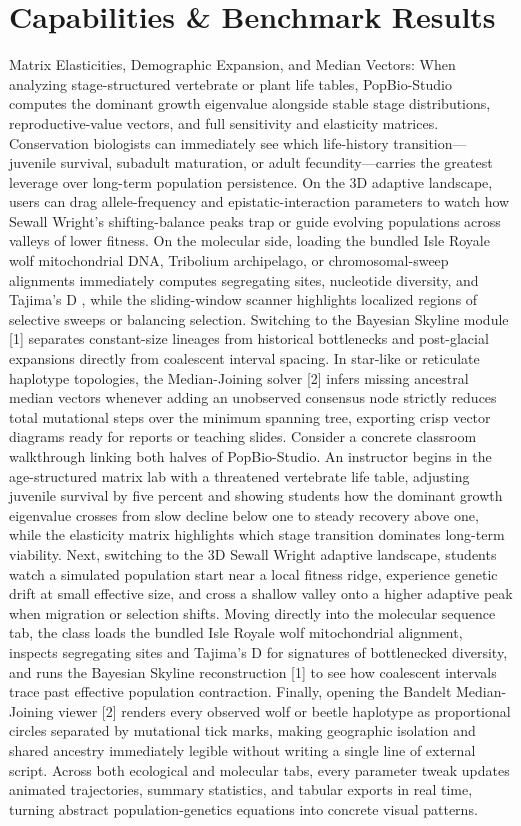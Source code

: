 \documentclass[10pt,letterpaper]{article}
\begin{document}
\section{Capabilities \& Benchmark Results}
Matrix Elasticities, Demographic Expansion, and Median Vectors: When analyzing stage-structured vertebrate or plant life tables, PopBio-Studio computes the dominant growth eigenvalue alongside stable stage distributions, reproductive-value vectors, and full sensitivity and elasticity matrices. Conservation biologists can immediately see which life-history transition---juvenile survival, subadult maturation, or adult fecundity---carries the greatest leverage over long-term population persistence. On the 3D adaptive landscape, users can drag allele-frequency and epistatic-interaction parameters to watch how Sewall Wright's shifting-balance peaks trap or guide evolving populations across valleys of lower fitness. On the molecular side, loading the bundled Isle Royale wolf mitochondrial DNA, Tribolium archipelago, or chromosomal-sweep alignments immediately computes segregating sites, nucleotide diversity, and Tajima's D , while the sliding-window scanner highlights localized regions of selective sweeps or balancing selection. Switching to the Bayesian Skyline module [1] separates constant-size lineages from historical bottlenecks and post-glacial expansions directly from coalescent interval spacing. In star-like or reticulate haplotype topologies, the Median-Joining solver [2] infers missing ancestral median vectors whenever adding an unobserved consensus node strictly reduces total mutational steps over the minimum spanning tree, exporting crisp vector diagrams ready for reports or teaching slides. Consider a concrete classroom walkthrough linking both halves of PopBio-Studio. An instructor begins in the age-structured matrix lab with a threatened vertebrate life table, adjusting juvenile survival by five percent and showing students how the dominant growth eigenvalue crosses from slow decline below one to steady recovery above one, while the elasticity matrix highlights which stage transition dominates long-term viability. Next, switching to the 3D Sewall Wright adaptive landscape, students watch a simulated population start near a local fitness ridge, experience genetic drift at small effective size, and cross a shallow valley onto a higher adaptive peak when migration or selection shifts. Moving directly into the molecular sequence tab, the class loads the bundled Isle Royale wolf mitochondrial alignment, inspects segregating sites and Tajima's D for signatures of bottlenecked diversity, and runs the Bayesian Skyline reconstruction [1] to see how coalescent intervals trace past effective population contraction. Finally, opening the Bandelt Median-Joining viewer [2] renders every observed wolf or beetle haplotype as proportional circles separated by mutational tick marks, making geographic isolation and shared ancestry immediately legible without writing a single line of external script. Across both ecological and molecular tabs, every parameter tweak updates animated trajectories, summary statistics, and tabular exports in real time, turning abstract population-genetics equations into concrete visual patterns.
\end{document}
